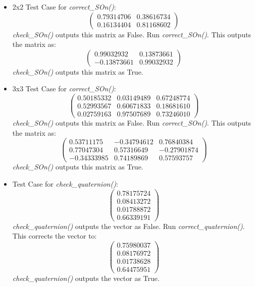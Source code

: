 \documentclass{article}
\begin{document}
\begin{itemize}
    \item 2x2 Test Case for \textit{correct\_SOn()}:
    \[
    \begin{pmatrix}
    0.79314706 & 0.38616734 \\
    0.16134404 & 0.81168602
    \end{pmatrix}
    \]
    \textit{check\_SOn()} outputs this matrix as False.
    Run \textit{correct\_SOn()}. This outputs the matrix as:
    \[
    \begin{pmatrix}
    0.99032932 & 0.13873661 \\
    -0.13873661 & 0.99032932
    \end{pmatrix}
    \]
    \textit{check\_SOn()} outputs this matrix as True.

    \item 3x3 Test Case for \textit{correct\_SOn()}:
    \[
    \begin{pmatrix}
    0.50185332 & 0.03149489 & 0.67248774 \\
    0.52993567 & 0.60671833 & 0.18681610 \\
    0.02759163 & 0.97507689 & 0.73246010
    \end{pmatrix}
    \]
    \textit{check\_SOn()} outputs this matrix as False.
    Run \textit{correct\_SOn()}. This outputs the matrix as:
    \[
    \begin{pmatrix}
    0.53711175 & -0.34794612 & 0.76840384 \\
    0.77047304 & 0.57316649 & -0.27901874 \\
    -0.34333985 & 0.74189869 & 0.57593757
    \end{pmatrix}
    \]
    \textit{check\_SOn()} outputs this matrix as True.

    \item Test Case for \textit{check\_quaternion()}:
    \[
    \begin{pmatrix}
    0.78175724 \\
    0.08413272 \\
    0.01788872 \\
    0.66339191
    \end{pmatrix}
    \]
    \textit{check\_quaternion()} outputs the vector as False.
    Run \textit{correct\_quaternion()}. This corrects the vector to:
    \[
    \begin{pmatrix}
    0.75980037 \\
    0.08176972 \\
    0.01738628 \\
    0.64475951
    \end{pmatrix}
    \]
    \textit{check\_quaternion()} outputs the vector as True.


\end{itemize}
\end{document}

